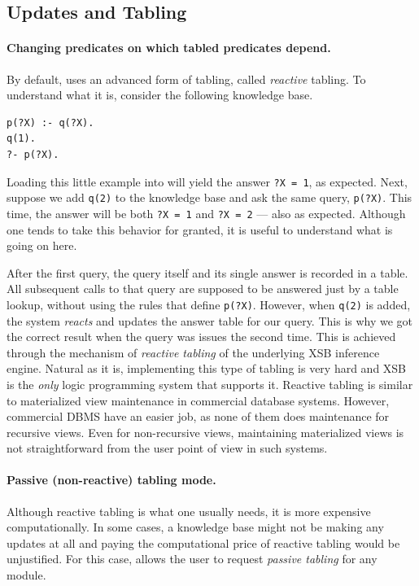 \documentclass[11pt]{article}
\newcommand{\ERGO}{\mbox{\smaller{\ensuremath{\cal{E}}\smaller{{\sc{RGO}}}}}\xspace}
\newcommand{\FLSYSTEM}{\ERGO}
\begin{document}
\subsection{Updates and Tabling}\label{sec-updates-tabling}

\paragraph{Changing predicates on which tabled predicates depend.}
By default, \FLSYSTEM uses an advanced form of tabling, called
\emph{reactive} tabling. To understand what it is, consider the following
knowledge base.
\begin{verbatim}
p(?X) :- q(?X).
q(1).
?- p(?X).
\end{verbatim}
Loading this little example into \FLSYSTEM will yield the answer
\texttt{?X = 1}, as expected. Next, suppose we add \texttt{q(2)} to the
knowledge base and ask the same query, \texttt{p(?X)}. This time, the answer
will be both \texttt{?X = 1} and \texttt{?X = 2} --- also as expected.
Although one tends to take this behavior for granted, it is useful to
understand what is going on here.

After the first query, the query itself and its single answer is recorded
in a table. All subsequent calls to that query are supposed to be answered
just by a table lookup, without using the rules that define \texttt{p(?X)}.
However, when \texttt{q(2)} is added, the system \emph{reacts} and updates the
answer table for our query. This is why we got the correct result when the
query was issues the second time. This is achieved through the mechanism of
\emph{reactive tabling} of the underlying XSB inference engine. Natural as
it is, implementing this type of tabling is very hard and XSB is the
\emph{only} logic programming system that supports it.
Reactive tabling is similar to materialized view maintenance in commercial
database systems. However, commercial DBMS have an easier job, as none of
them does maintenance for recursive views. Even for non-recursive views,
maintaining materialized views is not straightforward from the user
point of view in such systems.

\paragraph{Passive (non-reactive) tabling mode.}
Although reactive tabling is what one usually needs, it is more expensive
computationally. In some cases, a knowledge base might not be making any
updates at all and paying the computational
price of reactive tabling would be unjustified.
For this case, \FLSYSTEM allows the user to request \emph{passive tabling}
for any module.  
\end{document}
